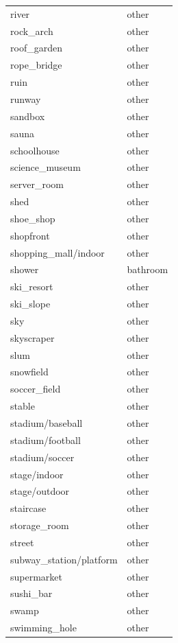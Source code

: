 \begin{table}[h!]
\begin{tabular}{| l | l |}
		river &        other \\
		rock\_arch &        other \\
		roof\_garden &        other \\
		rope\_bridge &        other \\
		ruin &        other \\
		runway &        other \\
		sandbox &        other \\
		sauna &        other \\
		schoolhouse &        other \\
		science\_museum &        other \\
		server\_room &        other \\
		shed &        other \\
		shoe\_shop &        other \\
		shopfront &        other \\
		shopping\_mall/indoor &        other \\
		shower &     bathroom \\
		ski\_resort &        other \\
		ski\_slope &        other \\
		sky &        other \\
		skyscraper &        other \\
		slum &        other \\
		snowfield &        other \\
		soccer\_field &        other \\
		stable &        other \\
		stadium/baseball &        other \\
		stadium/football &        other \\
		stadium/soccer &        other \\
		stage/indoor &        other \\
		stage/outdoor &        other \\
		staircase &        other \\
		storage\_room &        other \\
		street &        other \\
		subway\_station/platform &        other \\
		supermarket &        other \\
		sushi\_bar &        other \\
		swamp &        other \\
		swimming\_hole &        other \\

\end{tabular}
\end{table}
